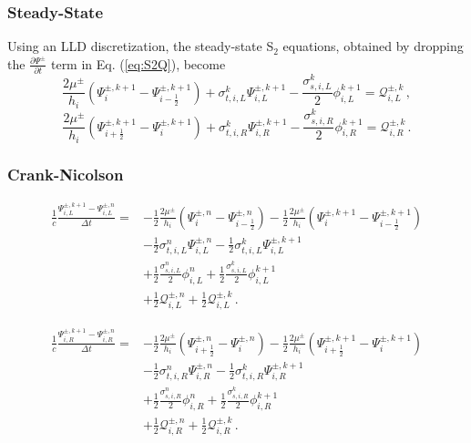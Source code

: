 \documentclass[preprint,12pt]{elsarticle}
\newcommand{\fn}[1]{\left( #1 \right)}
\newcommand{\dydt}[1]{\frac{\partial #1}{\partial t}}
\newcommand{\pec}{\, ,}
\newcommand{\pep}{\, .}
\newcommand{\lequ}[1]{\label{eq:#1}}
\newcommand{\requ}[1]{(\ref{eq:#1})}
\newcommand{\lsec}[1]{\label{sec:#1}}
\newcommand{\half}{\frac{1}{2}}
\newcommand{\Q}{\mathcal{Q}}
\newcommand{\dt}{\Delta t}
\newcommand{\iL}{_{i,L}}
\newcommand{\iR}{_{i,R}}
\begin{document}
\subsubsection{Steady-State}\lsec{S2ssdisc}
Using an LLD discretization, the steady-state S$_2$ equations, obtained by
dropping the $\dydt{\Psi^\pm}$ term in Eq. \requ{S2Q}, become
\begin{equation}\lequ{S2ssL}
  \frac{2\mu^\pm}{h_i}\fn{\Psi^{\pm,k+1}_i - \Psi^{\pm,k+1}_{i-\half}}
  +\sigma_{t,i,L}^k\Psi\iL^{\pm,k+1}
  -\frac{\sigma_{s,i,L}^k}{2}\phi\iL^{k+1}
  =\Q_{i,L}^{\pm,k} \pec
\end{equation}
\begin{equation}\lequ{S2ssR}
  \frac{2\mu^\pm}{h_i}\fn{\Psi^{\pm,k+1}_{i+\half} - \Psi^{\pm,k+1}_i}
  +\sigma_{t,i,R}^k\Psi\iR^{\pm,k+1}
  -\frac{\sigma_{s,i,R}^k}{2}\phi\iR^{k+1}
  =\Q_{i,R}^{\pm,k} \pep
\end{equation}



\subsubsection{Crank-Nicolson}\lsec{S2fullCN}
\begin{equation}\lequ{S2CNfullL}\begin{split}
  \frac{1}{c}\frac{\Psi\iL^{\pm,k+1}-\Psi\iL^{\pm,n}}{\dt} = &
  -\half\frac{2\mu^\pm}{h_i}\fn{\Psi^{\pm,n}_i - \Psi^{\pm,n}_{i-\half}}
  -\half\frac{2\mu^\pm}{h_i}\fn{\Psi^{\pm,k+1}_i - \Psi^{\pm,k+1}_{i-\half}}\\
  &-\half\sigma_{t,i,L}^n\Psi\iL^{\pm,n}
   -\half\sigma_{t,i,L}^k\Psi\iL^{\pm,k+1}\\
  &+\half\frac{\sigma_{s,i,L}^n}{2}\phi\iL^n
   +\half\frac{\sigma_{s,i,L}^k}{2}\phi\iL^{k+1}\\
  &+\half\Q_{i,L}^{\pm,n}
   +\half\Q_{i,L}^{\pm,k} \pep
\end{split}\end{equation}

\begin{equation}\lequ{S2CNfullR}\begin{split}
  \frac{1}{c}\frac{\Psi\iR^{\pm,k+1}-\Psi\iR^{\pm,n}}{\dt} = &
  -\half\frac{2\mu^\pm}{h_i}\fn{\Psi^{\pm,n}_{i+\half} - \Psi^{\pm,n}_i}
  -\half\frac{2\mu^\pm}{h_i}\fn{\Psi^{\pm,k+1}_{i+\half} - \Psi^{\pm,k+1}_i}\\
  &-\half\sigma_{t,i,R}^n\Psi\iR^{\pm,n}
   -\half\sigma_{t,i,R}^k\Psi\iR^{\pm,k+1}\\
  &+\half\frac{\sigma_{s,i,R}^n}{2}\phi\iR^n
   +\half\frac{\sigma_{s,i,R}^k}{2}\phi\iR^{k+1}\\
  &+\half\Q_{i,R}^{\pm,n}
   +\half\Q_{i,R}^{\pm,k} \pep
\end{split}\end{equation}
\end{document}
